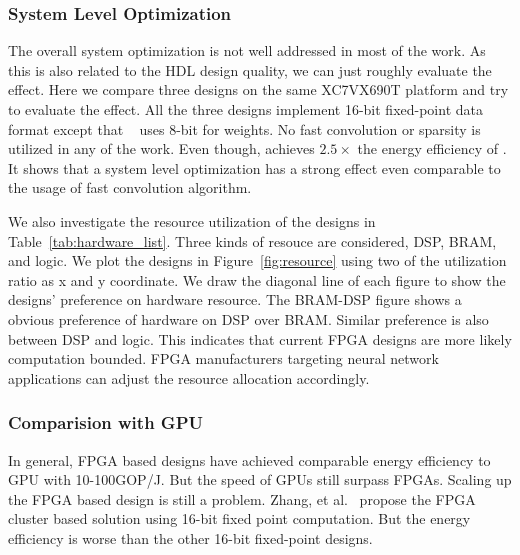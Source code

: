 \subsubsection*{\textbf{System Level Optimization}} The overall system optimization is not well addressed in most of the work. As this is also related to the HDL design quality, we can just roughly evaluate the effect. Here we compare three designs\cite{zhang2016caffeine, liu2016automatic, li2016high} on the same XC7VX690T platform and try to evaluate the effect. All the three designs implement 16-bit fixed-point data format except that ~\cite{liu2016automatic} uses 8-bit for weights. No fast convolution or sparsity is utilized in any of the work. Even though, \cite{li2016high} achieves $2.5\times$ the energy efficiency of \cite{liu2016automatic}. It shows that a system level optimization has a strong effect even comparable to the usage of fast convolution algorithm. 

We also investigate the resource utilization of the designs in Table~\ref{tab:hardware_list}. Three kinds of resouce are considered, DSP, BRAM, and logic. We plot the designs in Figure~\ref{fig:resource} using two of the utilization ratio as x and y coordinate. We draw the diagonal line of each figure to show the designs' preference on hardware resource. The BRAM-DSP figure shows a obvious preference of hardware on DSP over BRAM. Similar preference is also between DSP and logic. This indicates that current FPGA designs are more likely computation bounded. FPGA manufacturers targeting neural network applications can adjust the resource allocation accordingly.

\subsubsection*{\textbf{Comparision with GPU}} In general, FPGA based designs have achieved comparable energy efficiency to GPU with 10-100GOP/J. But the speed of GPUs still surpass FPGAs. Scaling up the FPGA based design is still a problem. Zhang, et al.~\cite{zhang2016energy} propose the FPGA cluster based solution using 16-bit fixed point computation. But the energy efficiency is worse than the other 16-bit fixed-point designs. 

